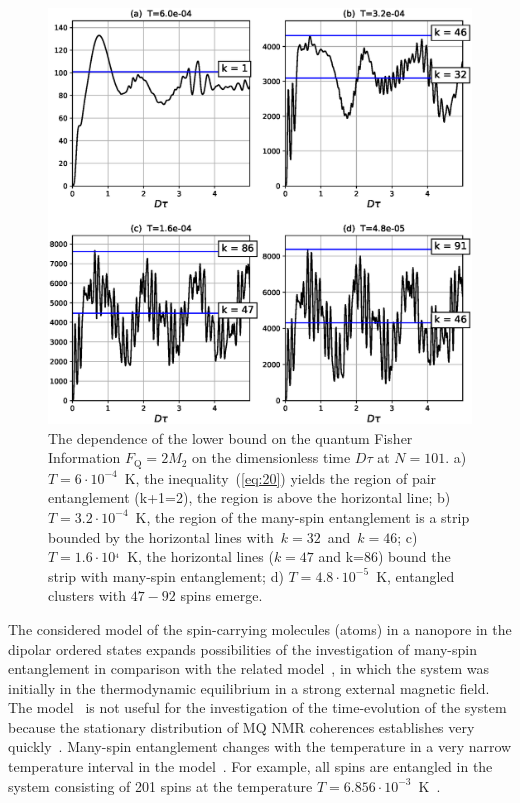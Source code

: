 \documentclass[review]{elsarticle}
\begin{document}
\begin{figure}
  	\includegraphics[width=0.95\linewidth]{fisher_low_bound_n101.eps}
	\caption{
	    The dependence of the lower bound on the quantum Fisher Information $F_\mathrm{Q} = 2 M_{2}$ 
	    on the dimensionless time $D\tau$ at $N=101$.
	    a) $T=6\cdot10^{-4}$~K, the inequality~(\ref{eq:20}) yields the region of pair entanglement (k+1=2), the region is above the horizontal line; 
	    b) $T=3.2\cdot10^{-4}$~K, the region of the many-spin entanglement is a strip bounded by the horizontal lines with~$k=32$~and~$k=46$; 
	    c) $T = 1.6\cdot10^{_4}$~K, the horizontal lines ($k=47$ and k=$86$) bound the strip with many-spin entanglement;
	    d) $T=4.8\cdot10^{-5}$~K, entangled clusters with $47-92$ spins emerge.
	}
	\label{fig:2}
\end{figure}

The considered model of the spin-carrying molecules (atoms) in a nanopore in the dipolar ordered states expands possibilities of the investigation of many-spin entanglement in comparison with the related model~\cite{Doronin_2019},
in which the system was initially in the thermodynamic equilibrium in a strong external magnetic field.
The model~\cite{Doronin_2019}  is not useful for the investigation of the time-evolution of the system
because the stationary distribution of MQ NMR coherences establishes very quickly~\cite{Doronin_2009}.
Many-spin entanglement changes with the temperature in a very narrow temperature interval in the model~\cite{Doronin_2019}.
For example, all spins are entangled in the system consisting of 201 spins at the temperature $T=6.856\cdot10^{-3}$~K~\cite{Doronin_2019}.
\end{document}
